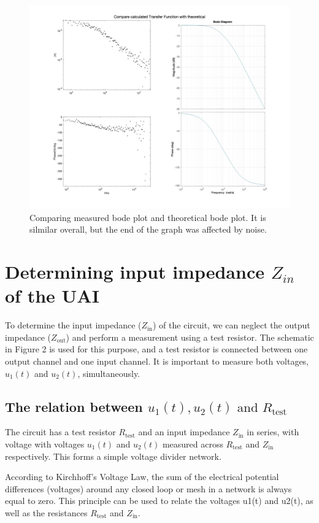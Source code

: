 \documentclass[
	a4paper,
	11pt,
]{article}
\begin{document}
\begin{figure}[htb!]
    \centerline{\includegraphics[width=15cm]{figure/A2/compare.jpg}}
    \caption{Comparing measured bode plot and theoretical bode plot. It is silmilar overall, but the end of the graph was affected by noise.}
    \label{fig:A2_compare}
\end{figure}


\section{Determining input impedance \(Z_{in}\) of the UAI}
To determine the input impedance (\(Z_{\text{in}}\)) of the circuit, we can neglect the output impedance (\(Z_{\text{out}}\)) and perform a measurement using a test resistor. The schematic in Figure 2 is used for this purpose, and a test resistor is connected between one output channel and one input channel. It is important to measure both voltages, \(u_1(t)\) and \(u_2(t)\), simultaneously.

\subsection{The relation between \(u_1(t), u_2(t) \mbox{ and } R_\text{test} \)}
The circuit has a test resistor \(R_\text{test}\) and an input impedance \(Z_\text{in}\) in series, with voltage with voltages \(u_1(t)\) and \(u_2(t)\) measured across \(R_\text{test}\) and \(Z_\text{in}\) respectively.  This forms a simple voltage divider network.

According to Kirchhoff’s Voltage Law, the sum of the electrical potential differences (voltages) around any closed loop or mesh in a network is always equal to zero. This principle can be used to relate the voltages u1(t) and u2(t), as well as the resistances \(R_\text{test}\) and \(Z_\text{in}\).
\end{document}
